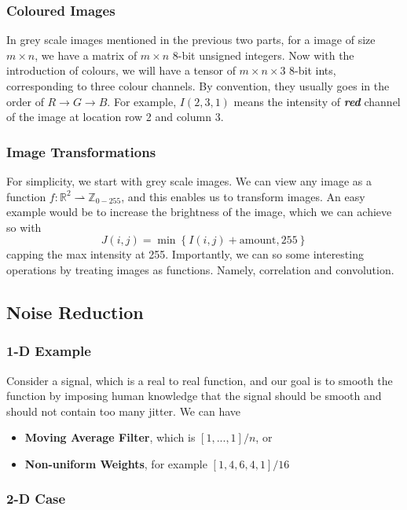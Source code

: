 \documentclass[11pt]{article}
\newcommand{\real}{\mathbb{R}}
\begin{document}
\subsubsection{Coloured Images}
In grey scale images mentioned in the previous two parts, for a image of size $m \times n$, we have a matrix of $m \times n$ 8-bit unsigned integers. Now with the introduction of colours, we will have a tensor of $m \times n \times 3$ 8-bit ints, corresponding to three colour channels. By convention, they usually goes in the order of $R \rightarrow G \rightarrow B$. For example, $I(2, 3, 1)$ means the intensity of \textit{\textbf{red}} channel of the image at location row 2 and column 3. 

\subsubsection{Image Transformations}
For simplicity, we start with grey scale images. We can view any image as a function $f: \real^2 \rightharpoonup \mathbb{Z}_{0 - 255}$, and this enables us to transform images. An easy example would be to increase the brightness of the image, which we can achieve so with
\begin{equation}
	J(i, j)= \min \left\{ I(i, j)+\text{amount}, 255\right\}
\end{equation}
capping the max intensity at 255. Importantly, we can so some interesting operations by treating images as functions. Namely, correlation and convolution. 

\subsection{Noise Reduction}
\subsubsection{1-D Example}
Consider a signal, which is a real to real function, and our goal is to smooth the function by imposing human knowledge that the signal should be smooth and should not contain too many jitter. We can have
\begin{itemize}
	\item \textbf{Moving Average Filter}, which is $[1, ..., 1]/n$, or
	\item \textbf{Non-uniform Weights}, for example $[1, 4, 6, 4, 1] / 16$
\end{itemize}

\subsubsection{2-D Case}
\end{document}
